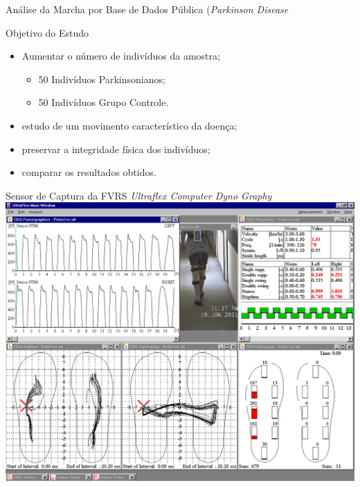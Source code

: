 \documentclass{beamer}
\begin{document}
\begin{frame}{Análise da Marcha por Base de Dados Pública (\textit{Parkinson Disease}~\cite{physionet}}
  \begin{block}{Objetivo do Estudo}
      \begin{itemize}[<+->]
				\item Aumentar o número de indivíduos da amostra;
						\begin{itemize}
							\item 50 Indivíduos Parkinsonianos;
							\item 50 Indivíduos Grupo Controle.
						\end{itemize}
				\item estudo de um movimento característico da doença;
				\item preservar a integridade física dos indivíduos;
				\item comparar os resultados obtidos.
			\end{itemize}
  \end{block}
\end{frame}

\begin{frame}{Sensor de Captura da FVRS \textit{Ultraflex Computer Dyno Graphy}}
      \center \includegraphics[height=2.8 in]{img/ultraflexdinografia.png}
\end{frame}
\end{document}
